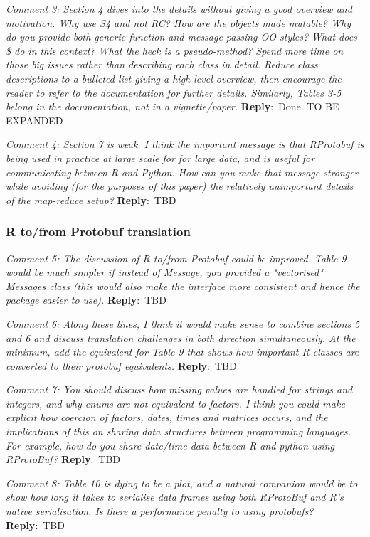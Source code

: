 \documentclass[10pt]{article}
\newcommand{\pointRaised}[2]{\smallskip %
  \textsl{{\fontseries{b}\selectfont #1}: #2}\newline}
\newcommand{\reply}[1]{\textbf{Reply}:\ #1 \smallskip } %
\begin{document}
\pointRaised{Comment 3}{Section 4 dives into the details without giving a good overview and
  motivation. Why use S4 and not RC? How are the objects made mutable?
  Why do you provide both generic function and message passing OO
  styles? What does \$ do in this context? What the heck is a
  pseudo-method? Spend more time on those big issues rather than
  describing each class in detail. Reduce class descriptions to a
  bulleted list giving a high-level overview, then encourage the reader
  to refer to the documentation for further details. Similarly, Tables
  3-5 belong in the documentation, not in a vignette/paper.}
\reply{Done. TO BE EXPANDED}

\pointRaised{Comment 4}{Section 7 is weak. I think the important message is that RProtobuf is
  being used in practice at large scale for for large data, and is
  useful for communicating between R and Python. How can you make that
  message stronger while avoiding (for the purposes of this paper) the
  relatively unimportant details of the map-reduce setup?}
\reply{TBD}

\subsubsection*{R to/from Protobuf translation}

\pointRaised{Comment 5}{The discussion of R to/from Protobuf could be improved. Table 9 would be
  much simpler if instead of Message, you provided a "vectorised"
  Messages class (this would also make the interface more consistent and
  hence the package easier to use).}
\reply{TBD}

\pointRaised{Comment 6}{Along these lines, I think it would make sense to combine sections 5
  and 6 and discuss translation challenges in both direction
  simultaneously. At the minimum, add the equivalent for Table 9 that
  shows how important R classes are converted to their protobuf
  equivalents.}
\reply{TBD}

\pointRaised{Comment 7}{You should discuss how missing values are handled for strings and
  integers, and why enums are not equivalent to factors. I think you
  could make explicit how coercion of factors, dates, times and matrices
  occurs, and the implications of this on sharing data structures
  between programming languages. For example, how do you share date/time
  data between R and python using RProtoBuf?}
\reply{TBD}

\pointRaised{Comment 8}{Table 10 is dying to be a plot, and a natural companion would be to
  show how long it takes to serialise data frames using both RProtoBuf
  and R's native serialisation. Is there a performance penalty to using
  protobufs?}
\reply{TBD}
\end{document}
